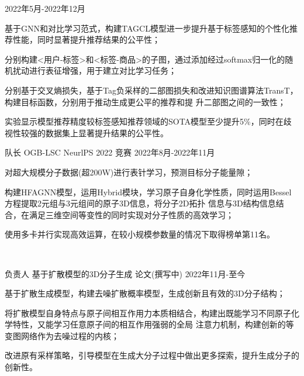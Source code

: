 \begin{cventries}
  {2022年5月-2022年12月} %
  {
    \begin{cvitems} %
      \item {基于GNN和对比学习范式，构建TAGCL模型进一步提升基于标签感知的个性化推荐性能，同时显著提升推荐结果的公平性；}
      \item {分别构建<用户-标签>和<标签-商品>的子图，通过添加经过softmax归一化的随机扰动进行表征增强，用于建立对比学习任务；}
      \item {分别基于交叉熵损失，基于Tag负采样的二部图损失和改进知识图谱算法TransT，构建目标函数，分别用于推动生成更公平的推荐和提
      升二部图之间的一致性；}
      \item {实验显示模型推荐精度较标签感知推荐领域的SOTA模型至少提升5\%，同时在歧视性较强的数据集上显著提升结果的公平性。}
    \end{cvitems}
  }
\cventry
  {队长} %
  {OGB-LSC NeurlPS 2022} %
  {竞赛} %
  {2022年8月-2022年11月} %
  {
    \begin{cvitems} %
      \item {对超大规模分子数据(超200W)进行表针学习，预测目标分子能量隙；}
      \item {构建HFAGNN模型，运用Hybrid模块，学习原子自身化学性质，同时运用Bessel方程提取2元组与3元组间的原子3D信息，将分子2D拓扑
      信息与3D结构信息结合，在满足三维空间等变性的同时实现对分子性质的高效学习；}
      \item {使用多卡并行实现高效运算，在较小规模参数量的情况下取得榜单第11名。}
    \end{cvitems}
  }

\

\cventry
  {负责人} %
  {基于扩散模型的3D分子生成} %
  {论文(撰写中)} %
  {2022年11月-至今} %
  {
    \begin{cvitems} 
      \item {基于扩散生成模型，构建去噪扩散概率模型，生成创新且有效的3D分子结构；}
      \item {将扩散模型自身特点与原子间相互作用力本质相结合，构建出既能学习不同原子化学特性，又能学习任意原子间的相互作用强弱的全局
      注意力机制，构建创新的等变图网络作为去噪过程的内核；}
      \item {改进原有采样策略，引导模型在生成大分子过程中做出更多探索，提升生成分子的创新性。}
    \end{cvitems}
  }


\end{cventries}
